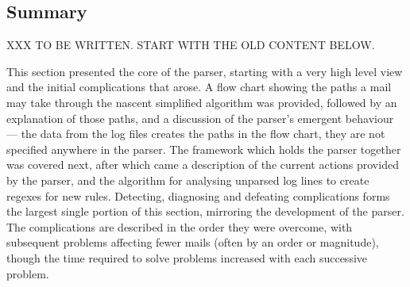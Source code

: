 \subsection{Summary}

XXX TO BE WRITTEN\@.  START WITH THE OLD CONTENT BELOW\@.

This section presented the core of the parser, starting with a very high
level view and the initial complications that arose.  A flow chart showing
the paths a mail may take through the nascent simplified algorithm was
provided, followed by an explanation of those paths, and a discussion of
the parser's emergent behaviour --- the data from the log files creates the
paths in the flow chart, they are not specified anywhere in the parser.
The framework which holds the parser together was covered next, after which
came a description of the current actions provided by the parser, and the
algorithm for analysing unparsed log lines to create regexes for new
rules.  Detecting, diagnosing and defeating complications forms the largest
single portion of this section, mirroring the development of the parser.
The complications are described in the order they were overcome, with
subsequent problems affecting fewer mails (often by an order or magnitude),
though the time required to solve problems increased with each successive
problem.


